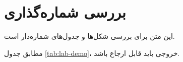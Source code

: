 \documentclass[12pt,a4paper]{article}
\begin{document}
\MakeLabTitle
\section{بررسی شماره‌گذاری}
این متن برای بررسی شکل‌ها و جدول‌های شماره‌دار است.

مطابق جدول \ref{tab:lab-demo}، خروجی باید قابل ارجاع باشد.
\end{document}
